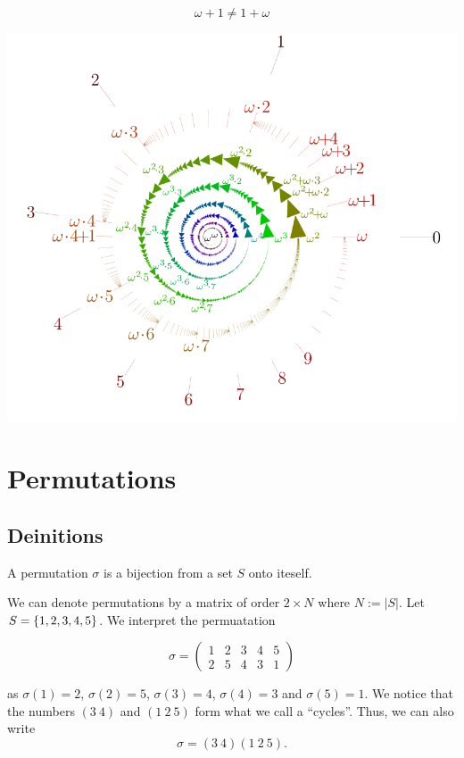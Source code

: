 \documentclass[11pt,a4paper]{article}
\begin{document}
\maketitle

\vspace{1cm}

\[
  \omega + 1 \neq 1 + \omega
\]

\begin{center}
\includegraphics[scale=0.50]{ordinals.svg.png}
\end{center}

\newpage
\tableofcontents
\newpage

\section{Permutations}
\subsection{Deinitions}

\begin{definition}[Permutation]
  A permutation $\sigma$ is a bijection from a set $S$ onto iteself.
\end{definition}
\begin{example}
  We can denote permutations by a matrix of order $2 \times N$ where
  $N := |S|$.
  Let $S = \set{1, 2, 3, 4, 5}$.
  We interpret the permuatation
	\begin{center}
    \[
      \sigma =
			\begin{pmatrix}
				1 & 2 & 3 & 4 & 5\\
				2 & 5 & 4 & 3 & 1
			\end{pmatrix}
    \]
	\end{center}
  as $\sigma(1) = 2$, $\sigma(2) = 5$, $\sigma(3) = 4$, $\sigma(4) = 3$
  and $\sigma(5) = 1$.
  We notice that the numbers $(3 \ 4)$ and $(1 \ 2 \ 5)$ form what we
  call a ``cycles''.
  Thus, we can also write
  \[
    \sigma = (3 \ 4)(1 \ 2 \ 5).
  \]
  \end{example}
\end{document}
